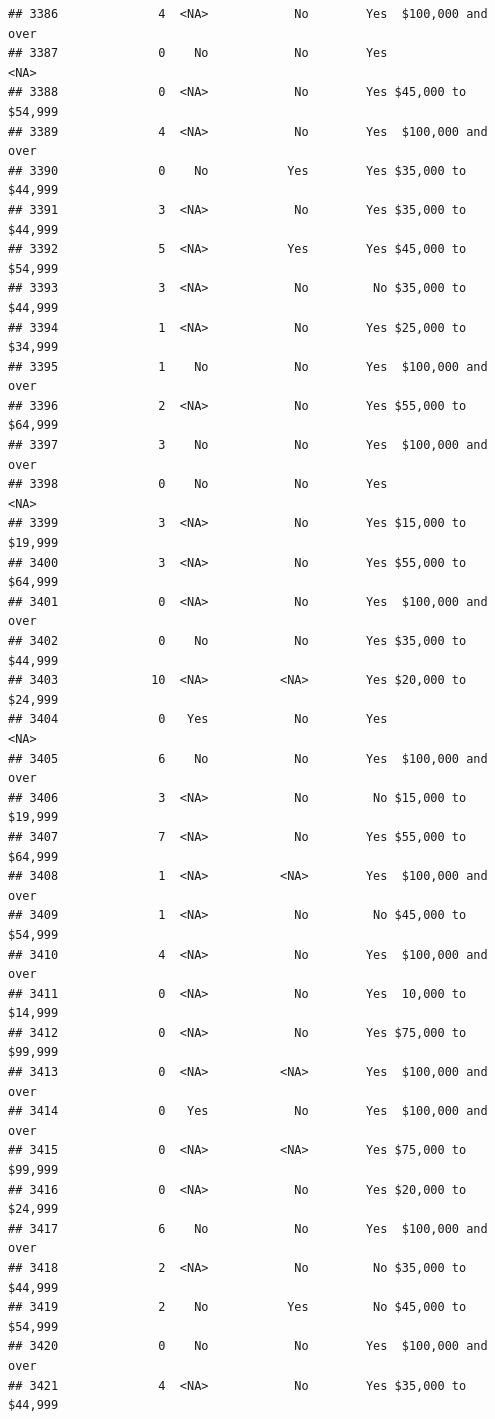 \documentclass[man]{apa6}
\begin{document}
\begin{verbatim}
## 3386              4  <NA>            No        Yes  $100,000 and over
## 3387              0    No            No        Yes               <NA>
## 3388              0  <NA>            No        Yes $45,000 to $54,999
## 3389              4  <NA>            No        Yes  $100,000 and over
## 3390              0    No           Yes        Yes $35,000 to $44,999
## 3391              3  <NA>            No        Yes $35,000 to $44,999
## 3392              5  <NA>           Yes        Yes $45,000 to $54,999
## 3393              3  <NA>            No         No $35,000 to $44,999
## 3394              1  <NA>            No        Yes $25,000 to $34,999
## 3395              1    No            No        Yes  $100,000 and over
## 3396              2  <NA>            No        Yes $55,000 to $64,999
## 3397              3    No            No        Yes  $100,000 and over
## 3398              0    No            No        Yes               <NA>
## 3399              3  <NA>            No        Yes $15,000 to $19,999
## 3400              3  <NA>            No        Yes $55,000 to $64,999
## 3401              0  <NA>            No        Yes  $100,000 and over
## 3402              0    No            No        Yes $35,000 to $44,999
## 3403             10  <NA>          <NA>        Yes $20,000 to $24,999
## 3404              0   Yes            No        Yes               <NA>
## 3405              6    No            No        Yes  $100,000 and over
## 3406              3  <NA>            No         No $15,000 to $19,999
## 3407              7  <NA>            No        Yes $55,000 to $64,999
## 3408              1  <NA>          <NA>        Yes  $100,000 and over
## 3409              1  <NA>            No         No $45,000 to $54,999
## 3410              4  <NA>            No        Yes  $100,000 and over
## 3411              0  <NA>            No        Yes  10,000 to $14,999
## 3412              0  <NA>            No        Yes $75,000 to $99,999
## 3413              0  <NA>          <NA>        Yes  $100,000 and over
## 3414              0   Yes            No        Yes  $100,000 and over
## 3415              0  <NA>          <NA>        Yes $75,000 to $99,999
## 3416              0  <NA>            No        Yes $20,000 to $24,999
## 3417              6    No            No        Yes  $100,000 and over
## 3418              2  <NA>            No         No $35,000 to $44,999
## 3419              2    No           Yes         No $45,000 to $54,999
## 3420              0    No            No        Yes  $100,000 and over
## 3421              4  <NA>            No        Yes $35,000 to $44,999

\end{verbatim}
\end{document}

